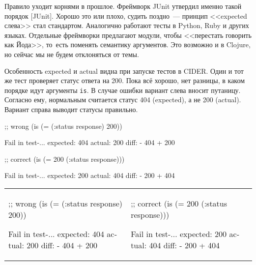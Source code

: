 \fi


Правило уходит корнями в прошлое. Фреймворк JUnit утвердил именно такой порядок
[JUnit].
Хорошо это или плохо, судить поздно~--- принцип <<expected слева>> стал
стандартом. Аналогично работают тесты в Python, Ruby и других языках. Отдельные
фреймворки предлагают модули, чтобы <<перестать говорить как Йода>>, то~есть
поменять семантику аргументов. Это возможно и в Clojure, но сейчас мы не будем
отклоняться от темы.


Особенность expected и actual видна при запуске тестов в CIDER. Один и тот же
тест проверяет статус ответа на 200. Пока всё хорошо, нет разницы, в каком
порядке идут аргументы \verb|is|. В случае ошибки вариант слева вносит
путаницу. Согласно ему, нормальным считается статус 404 (expected), а не 200
(actual). Вариант справа выводит статусы правильно.

\ifx\devicetype\mobile

\begin{english}
  \begin{clojure}
;; wrong
(is (= (:status response)
       200))

Fail in test-...
expected: 404
  actual: 200
    diff: - 404
          + 200
  \end{clojure}

\splitter

  \begin{clojure}
;; correct
(is (= 200
       (:status response)))

Fail in test-...
expected: 200
  actual: 404
    diff: - 200
          + 404
  \end{clojure}
\end{english}

\else

\begin{english}

\noindent
\begin{tabular}{ @{}p{5cm} @{}p{5cm} }

  \begin{clojure}
;; wrong
(is (= (:status response)
       200))

Fail in test-...
expected: 404
  actual: 200
    diff: - 404
          + 200
  \end{clojure}

&

  \begin{clojure}
;; correct
(is (= 200
       (:status response)))

Fail in test-...
expected: 200
  actual: 404
    diff: - 200
          + 404
  \end{clojure}

\end{tabular}

\end{english}

